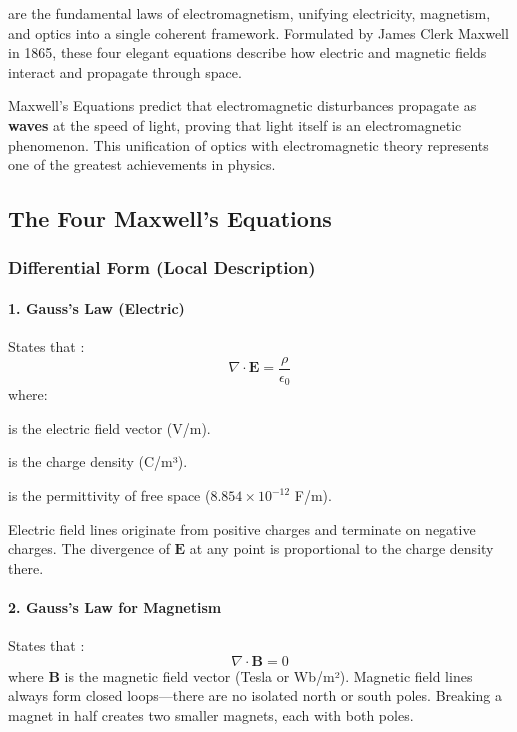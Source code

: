  are the fundamental laws of electromagnetism, unifying electricity, magnetism, and optics into a single coherent framework. Formulated by James Clerk Maxwell in 1865, these four elegant equations describe how electric and magnetic fields interact and propagate through space.

\begin{keyconcept}
    Maxwell's Equations predict that electromagnetic disturbances propagate as \textbf{waves} at the speed of light, proving that light itself is an electromagnetic phenomenon. This unification of optics with electromagnetic theory represents one of the greatest achievements in physics.
\end{keyconcept}

\subsection{The Four Maxwell's Equations}

\subsubsection{Differential Form (Local Description)}

\paragraph{1. Gauss's Law (Electric)}
States that :
\begin{equation}
    \nabla \cdot \mathbf{E} = \frac{\rho}{\epsilon_0}
    \label{eq:gauss-electric}
\end{equation}
where:
\begin{description}[font=\normalfont, style=unboxed]
    \item[$\mathbf{E}$] is the electric field vector (V/m).
    \item[$\rho$] is the charge density (C/m³).
    \item[$\epsilon_0$] is the permittivity of free space ($8.854 \times 10^{-12}$ F/m).
\end{description}
 Electric field lines originate from positive charges and terminate on negative charges. The divergence of $\mathbf{E}$ at any point is proportional to the charge density there.

\paragraph{2. Gauss's Law for Magnetism}
States that :
\begin{equation}
    \nabla \cdot \mathbf{B} = 0
    \label{eq:gauss-magnetic}
\end{equation}
where $\mathbf{B}$ is the magnetic field vector (Tesla or Wb/m²).
 Magnetic field lines always form closed loops---there are no isolated north or south poles. Breaking a magnet in half creates two smaller magnets, each with both poles.

